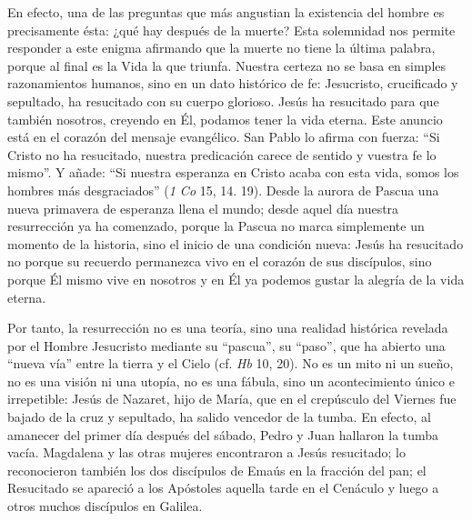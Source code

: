 			\begin{body}En efecto, una de las preguntas que más angustian la existencia del hombre es precisamente ésta: ¿qué hay después de la muerte? Esta solemnidad nos permite responder a este enigma afirmando que la muerte no tiene la última palabra, porque al final es la Vida la que triunfa. Nuestra certeza no se basa en simples razonamientos humanos, sino en un dato histórico de fe: Jesucristo, crucificado y sepultado, ha resucitado con su cuerpo glorioso. Jesús ha resucitado para que también nosotros, creyendo en Él, podamos tener la vida eterna. Este anuncio está en el corazón del mensaje evangélico. San Pablo lo afirma con fuerza: “Si Cristo no ha resucitado, nuestra predicación carece de sentido y vuestra fe lo mismo”. Y añade: “Si nuestra esperanza en Cristo acaba con esta vida, somos los hombres más desgraciados” (\textit{1 Co} 15, 14. 19). Desde la aurora de Pascua una nueva primavera de esperanza llena el mundo; desde aquel día nuestra resurrección ya ha comenzado, porque la Pascua no marca simplemente un momento de la historia, sino el inicio de una condición nueva: Jesús ha resucitado no porque su recuerdo permanezca vivo en el corazón de sus discípulos, sino porque Él mismo vive en nosotros y en Él ya podemos gustar la alegría de la vida eterna.\end{body}
			
			\begin{body}Por tanto, la resurrección no es una teoría, sino una realidad histórica revelada por el Hombre Jesucristo mediante su “pascua”, su “paso”, que ha abierto una “nueva vía” entre la tierra y el Cielo (cf. \textit{Hb} 10, 20). No es un mito ni un sueño, no es una visión ni una utopía, no es una fábula, sino un acontecimiento único e irrepetible: Jesús de Nazaret, hijo de María, que en el crepúsculo del Viernes fue bajado de la cruz y sepultado, ha salido vencedor de la tumba. En efecto, al amanecer del primer día después del sábado, Pedro y Juan hallaron la tumba vacía. Magdalena y las otras mujeres encontraron a Jesús resucitado; lo reconocieron también los dos discípulos de Emaús en la fracción del pan; el Resucitado se apareció a los Apóstoles aquella tarde en el Cenáculo y luego a otros muchos discípulos en Galilea. \end{body}
			
